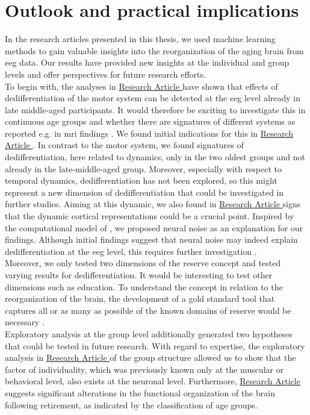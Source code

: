 \section{Outlook and practical implications}
In the research articles presented in this thesis, we used machine learning methods to gain valuable insights into the reorganization of the aging brain from \gls{eeg} data. Our results have provided new insights at the individual and group levels and offer perspectives for future research efforts.\\
To begin with, the analyses in \hyperref[results:paperI]{Research Article } have shown that effects of dedifferentiation of the motor system can be detected at the \gls{eeg} level already in late middle-aged participants. It would therefore be exciting to investigate this in continuous age groups and whether there are signatures of different systems as reported e.g. in \gls{mri} findings \cite{Raz2006}. We found initial indications for this in \hyperref[results:paperII]{Research Article }. In contrast to the motor system, we found signatures of dedifferentiation, here related to dynamics, only in the two oldest groups and not already in the late-middle-aged group. Moreover, especially with respect to temporal dynamics, dedifferentiation has not been explored, so this might represent a new dimension of dedifferentiation that could be investigated in further studies. Aiming at this dynamic, we also found in \hyperref[results:paperIII]{Research Article } signs that the dynamic cortical representations could be a crucial point. Inspired by the computational model of \citeauthor{Li2002} \cite{Li2002,Li2000}, we proposed neural noise as an explanation for our findings. Although initial findings suggest that neural noise may indeed explain dedifferentiation at the \gls{eeg} level, this requires further investigation \cite{Pichot2022}.\\
Moreover, we only tested two dimensions of the reserve concept and tested varying results for dedifferentiation. It would be interesting to test other dimensions such as education. To understand the concept in relation to the reorganization of the brain, the development of a gold standard tool that captures all or as many as possible of the known domains of reserve would be necessary \cite{Nogueira2022}.\\
\indent Exploratory analysis at the group level additionally generated two hypotheses that could be tested in future research. With regard to expertise, the exploratory analysis in \hyperref[results:paperIII]{Research Article } of the group structure allowed us to show that the factor of individuality, which was previously known only at the muscular or behavioral level, also exists at the neuronal level. Furthermore, \hyperref[results:paperII]{Research Article } suggests significant alterations in the functional organization of the brain following retirement, as indicated by the classification of age groups.\\
